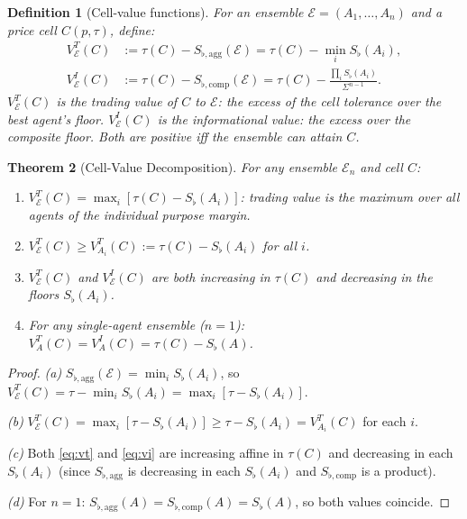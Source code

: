\documentclass[twocolumn,11pt,a4paper]{article}
\newtheorem{theorem}{Theorem}[section]
\newtheorem{definition}[theorem]{Definition}
\theoremstyle{remark}
\newcommand{\Sflat}{S_{\flat}}
\newcommand{\tol}{\tau}
\newcommand{\Ens}{\mathcal{E}}
\newcommand{\ValT}{V^T}                  %
\newcommand{\ValI}{V^I}                  %
\newcommand{\SflatT}{S_{\flat,\mathrm{agg}}}        %
\newcommand{\SflatI}{S_{\flat,\mathrm{comp}}}       %
\begin{document}
\begin{definition}[Cell-value functions]
\label{def:cell-value}
For an ensemble $\Ens = (A_1,\ldots,A_n)$ and a price cell
$C(p,\tol)$, define:
\begin{align}
  \ValT_\Ens(C) &:= \tol(C) - \SflatT(\Ens) = \tol(C) - \min_i \Sflat(A_i),
  \label{eq:vt}\\
  \ValI_\Ens(C) &:= \tol(C) - \SflatI(\Ens) = \tol(C)
  - \frac{\prod_i \Sflat(A_i)}{\Sigma^{n-1}}.
  \label{eq:vi}
\end{align}
$\ValT_\Ens(C)$ is the \emph{trading value} of $C$ to $\Ens$: the excess
of the cell tolerance over the best agent's floor.
$\ValI_\Ens(C)$ is the \emph{informational value}: the excess over the
composite floor.  Both are positive iff the ensemble can attain $C$.
\end{definition}

\begin{theorem}[Cell-Value Decomposition]
\label{thm:cell-value}
For any ensemble $\Ens_n$ and cell $C$:
\begin{enumerate}[label=\textup{(\alph*)}]
\item $\ValT_\Ens(C) = \max_i [\tol(C) - \Sflat(A_i)]$: trading value is
  the maximum over all agents of the individual purpose margin.
\item $\ValT_\Ens(C) \ge \ValT_{A_i}(C) := \tol(C) - \Sflat(A_i)$ for all $i$.
\item $\ValT_\Ens(C)$ and $\ValI_\Ens(C)$ are both increasing in $\tol(C)$
  and decreasing in the floors $\Sflat(A_i)$.
\item For any single-agent ensemble ($n=1$): $\ValT_A(C) = \ValI_A(C) =
  \tol(C) - \Sflat(A)$.
\end{enumerate}
\end{theorem}
\begin{proof}
\textit{(a)}  $\SflatT(\Ens) = \min_i \Sflat(A_i)$, so $\ValT_\Ens(C) =
\tol - \min_i \Sflat(A_i) = \max_i [\tol - \Sflat(A_i)]$.

\textit{(b)}  $\ValT_\Ens(C) = \max_i[\tol - \Sflat(A_i)] \ge \tol -
\Sflat(A_i) = \ValT_{A_i}(C)$ for each $i$.

\textit{(c)}  Both \eqref{eq:vt} and \eqref{eq:vi} are increasing affine
in $\tol(C)$ and decreasing in each $\Sflat(A_i)$ (since $\SflatT$ is
decreasing in each $\Sflat(A_i)$ and $\SflatI$ is a product).

\textit{(d)}  For $n=1$: $\SflatT(A) = \SflatI(A) = \Sflat(A)$, so both
values coincide.
\end{proof}
\end{document}
